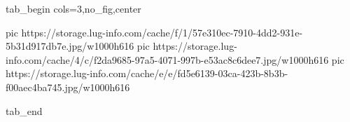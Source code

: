  
 
 
 
 


\ifcmt
  tab_begin cols=3,no_fig,center

     pic https://storage.lug-info.com/cache/f/1/57e310ec-7910-4dd2-931e-5b31d917db7e.jpg/w1000h616%
		 pic https://storage.lug-info.com/cache/4/c/f2da9685-97a5-4071-997b-e53ac8c6dee7.jpg/w1000h616%
		 pic https://storage.lug-info.com/cache/e/e/fd5e6139-03ca-423b-8b3b-f00aec4ba745.jpg/w1000h616%

  tab_end
\fi

